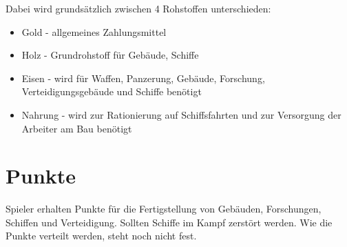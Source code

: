 \documentclass[10pt,a4paper]{article}
\begin{document}
Dabei wird grundsätzlich zwischen 4 Rohstoffen unterschieden:
\begin{itemize}
\item Gold - allgemeines Zahlungsmittel
\item Holz - Grundrohstoff für Gebäude, Schiffe
\item Eisen - wird für Waffen, Panzerung, Gebäude, Forschung,  Verteidigungsgebäude und Schiffe benötigt
\item Nahrung - wird zur Rationierung auf Schiffsfahrten und zur Versorgung der Arbeiter am Bau benötigt
\end{itemize}
\section{Punkte}
Spieler erhalten Punkte für die Fertigstellung von Gebäuden, Forschungen, Schiffen und Verteidigung.
Sollten Schiffe im Kampf zerstört werden. Wie die Punkte verteilt werden, steht noch nicht fest.

\pagebreak
\end{document}
